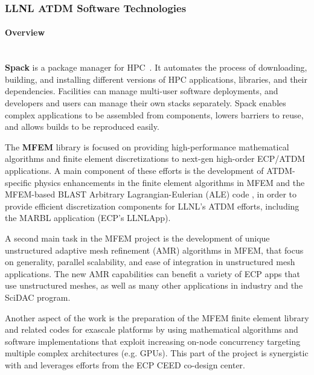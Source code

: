 \subsubsection{ LLNL ATDM Software Technologies}

\paragraph{Overview} \leavevmode \\

\textbf{Spack} is a package manager for
HPC~\cite{stewart+:sc19-spack-bof,gamblin+:sc19-spack-tutorial,gamblin+:lanl-spack-tutorial-2019,gamblin+:doe-nsf-spack-tutorial,baber+:pearc19-spack-tutorial,gamblin+:isc19-spack-tutorial,gamblin+:ecp19-spack-roundtable,gamblin+:ecp19-spack-tutorial,gamblin+:sc18-spack-bof,gamblin+:sc18-spack-tutorial,gamblin+:ecp18-spack-sotu,gamblin+:ecp18-spack-tutorial,gamblin+:sc17-spack-tutorial,gamblin:hpckp17,gamblin+:llnl-spack-tutorial-17,gamblin+:sc16-spack-tutorial}.
It automates the process of downloading, building, and installing
different versions of HPC applications, libraries, and their
dependencies.  Facilities can manage multi-user software deployments, and
developers and users can manage their own stacks separately.  Spack
enables complex applications to be assembled from components, lowers
barriers to reuse, and allows builds to be reproduced easily.

The \textbf{MFEM} library
\cite{MFEM,mfem_paper_2020} is focused on providing high-performance mathematical algorithms
and finite element discretizations to next-gen high-order ECP/ATDM
applications. A main component of these efforts is the development of
ATDM-specific physics enhancements in the finite element algorithms in
MFEM and the MFEM-based BLAST Arbitrary Lagrangian-Eulerian (ALE)
code \cite{BLAST}, in order to provide efficient discretization
components for LLNL's ATDM efforts, including the MARBL application
(ECP's LLNLApp).

A second main task in the MFEM project is the development of unique unstructured
adaptive mesh refinement (AMR) algorithms in MFEM, that focus on generality,
parallel scalability, and ease of integration in unstructured mesh
applications. The new AMR capabilities can benefit a variety of ECP apps that
use unstructured meshes, as well as many other applications in industry and the
SciDAC program.

Another aspect of the work is the preparation of the MFEM finite element library
and related codes for exascale platforms by using mathematical algorithms and
software implementations that exploit increasing on-node concurrency targeting
multiple complex architectures (e.g. GPUs). This part of the project is
synergistic with and leverages efforts from the ECP CEED co-design center.

